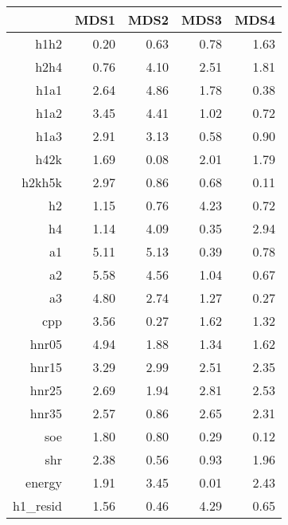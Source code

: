 \begin{table}[ht]
\centering
\begin{tabular}{rrrrr}
  \hline
 & MDS1 & MDS2 & MDS3 & MDS4 \\ 
  \hline
h1h2 & 0.20 & 0.63 & 0.78 & 1.63 \\ 
  h2h4 & 0.76 & 4.10 & 2.51 & 1.81 \\ 
  h1a1 & 2.64 & 4.86 & 1.78 & 0.38 \\ 
  h1a2 & 3.45 & 4.41 & 1.02 & 0.72 \\ 
  h1a3 & 2.91 & 3.13 & 0.58 & 0.90 \\ 
  h42k & 1.69 & 0.08 & 2.01 & 1.79 \\ 
  h2kh5k & 2.97 & 0.86 & 0.68 & 0.11 \\ 
  h2 & 1.15 & 0.76 & 4.23 & 0.72 \\ 
  h4 & 1.14 & 4.09 & 0.35 & 2.94 \\ 
  a1 & 5.11 & 5.13 & 0.39 & 0.78 \\ 
  a2 & 5.58 & 4.56 & 1.04 & 0.67 \\ 
  a3 & 4.80 & 2.74 & 1.27 & 0.27 \\ 
  cpp & 3.56 & 0.27 & 1.62 & 1.32 \\ 
  hnr05 & 4.94 & 1.88 & 1.34 & 1.62 \\ 
  hnr15 & 3.29 & 2.99 & 2.51 & 2.35 \\ 
  hnr25 & 2.69 & 1.94 & 2.81 & 2.53 \\ 
  hnr35 & 2.57 & 0.86 & 2.65 & 2.31 \\ 
  soe & 1.80 & 0.80 & 0.29 & 0.12 \\ 
  shr & 2.38 & 0.56 & 0.93 & 1.96 \\ 
  energy & 1.91 & 3.45 & 0.01 & 2.43 \\ 
  h1\_resid & 1.56 & 0.46 & 4.29 & 0.65 \\ 
   \hline
\end{tabular}
\end{table}
